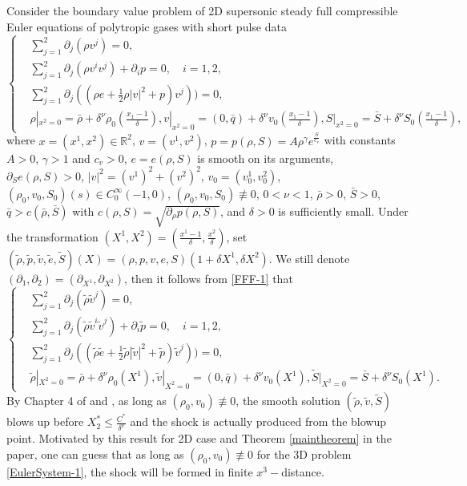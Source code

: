 \documentclass[11pt,twoside]{article}
\def\f{\frac}
\def\p{\partial}
\begin{document}
\begin{remark}\label{Yin.8}
Consider the boundary value problem of 2D supersonic steady full compressible Euler equations of polytropic gases
with short pulse data
\begin{equation}\label{FFF-1}
\begin{cases}
&\displaystyle\sum_{j=1}^{2}\partial_{j}(\rho v^{j})=0, \\
&\displaystyle\sum_{j=1}^{2}\partial_{j}(\rho v^{i} v^{j})+\partial_{i} p = 0 ,\quad i = 1, 2,\\
&\displaystyle\sum_{j=1}^{2}\partial_j((\rho e+\f12 \rho |v|^2+p)v^j))=0,\\
&\rho|_{x^2=0}=\bar\rho+\delta^{\nu}\rho_0(\f{x_1-1}{\delta}), v|_{x^2=0}=(0,\bar q)+\delta^{\nu} v_0(\f{x_1-1}{\delta}),
S|_{x^2=0}=\bar S+\delta^{\nu} S_0(\f{x_1-1}{\delta}),
\end{cases}
\end{equation}
where $x=(x^1, x^2)\in\mathbb{R}^2$, $v=(v^1,v^2)$, $p=p(\rho,S)=A\rho^{\gamma}e^{\f{S}{c_v}}$ with constants $A>0$,  $\gamma>1$
and $c_v>0$, $e=e(\rho, S)$ is smooth on its arguments, $\p_Se(\rho, S)>0$, $|v|^2=(v^1)^2+(v^2)^2$, $v_0=(v^1_0,v^2_0)$, $(\rho_0,v_0,S_0)(s)\in C_0^\infty(-1, 0)$, $(\rho_0,v_0,S_0)\not\equiv 0$, $0<\nu<1$,
$\bar\rho>0$, $\bar S>0$, $\bar q>c(\bar\rho,\bar S)$ with $c(\rho,S)=\sqrt{\p_{\rho}p(\rho, S)}$,
and $\delta>0$ is sufficiently small.
Under the transformation $(X^1,X^2)=(\f{x^1-1}{\delta}, \f{x^2}{\delta})$, set $(\tilde \rho, \tilde p, \tilde v, \tilde e, \tilde S)(X)=
(\rho, p, v, e, S)(1+\delta X^1, \delta X^2)$. We still denote $(\p_1,\p_2)=(\p_{X^1}, \p_{X^2})$, then it follows
from \eqref{FFF-1} that
\begin{equation}\label{FFF-01}
\begin{cases}
&\displaystyle\sum_{j=1}^{2}\partial_{j}(\tilde\rho \tilde v^{j})=0, \\
&\displaystyle\sum_{j=1}^{2}\partial_{j}(\tilde \rho \tilde v^{i} \tilde v^{j})+\partial_{i} \tilde p = 0 ,\quad i = 1, 2,\\
&\displaystyle\sum_{j=1}^{2}\partial_j((\tilde \rho\tilde  e+\f12 \tilde\rho |\tilde v|^2+\tilde p)\tilde v^j))=0,\\
&\tilde\rho|_{X^2=0}=\bar\rho+\delta^{\nu}\rho_0(X^1), \tilde v|_{X^2=0}=(0, \bar q)+\delta^{\nu} v_0(X^1),
\tilde S|_{X^2=0}=\bar S+\delta^{\nu} S_0(X^1).
\end{cases}
\end{equation}
By Chapter 4 of \cite{H} and \cite{DingM-Yin}, as long as $(\rho_0,v_0)\not\equiv 0$,
the smooth solution $(\tilde \rho, \tilde v, \tilde S)$ blows up before $X_2^*\le\f{C^*}{\delta^{\nu}}$
and the shock is actually produced from the blowup point. Motivated by this result for 2D case and Theorem \ref{maintheorem} in the paper,
one can guess that as long as $(\rho_0,v_0)\not\equiv 0$ for the 3D problem \eqref{EulerSystem-1}, the shock will be formed
in finite $x^3-$distance.
\end{remark}
\end{document}

